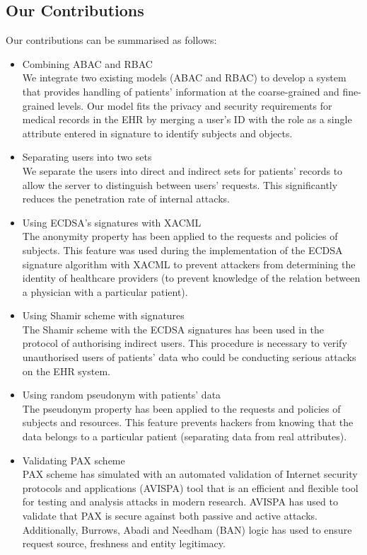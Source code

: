 \documentclass[journal,article,submit,moreauthors,pdftex]{Definitions/mdpi}
\begin{document}
\subsection{Our Contributions}
Our contributions can be summarised as follows:
  \begin{itemize}
\item Combining ABAC and RBAC \\
We integrate two existing models (ABAC and RBAC) to develop a system that provides handling of patients' information at the coarse-grained and fine-grained levels. Our model fits the privacy and security requirements for medical records in the EHR by merging a user's ID with the role as a single attribute entered in signature to identify subjects and objects.
\item Separating users into two sets\\
We separate the users into direct and indirect sets for patients' records to allow the server to distinguish between users' requests. This significantly reduces the penetration rate of internal attacks.
\item Using ECDSA's signatures with XACML\\
The anonymity property has been applied to the requests and policies of subjects. This feature was used during the implementation of the ECDSA signature algorithm with XACML to prevent attackers from determining the identity of healthcare providers (to prevent knowledge of the relation between a physician with a particular patient).
\item Using Shamir scheme with signatures\\
The Shamir scheme with the ECDSA signatures has been used in the protocol of authorising indirect users. This procedure is necessary to verify unauthorised users of patients' data who could be conducting serious attacks on the EHR system.
\item Using random pseudonym with patients' data\\
The pseudonym property has been applied to the requests and policies of subjects and resources. This feature prevents hackers from knowing that the data belongs to a particular patient (separating data from real attributes).
\item Validating PAX scheme\\
PAX scheme has simulated with an automated validation of Internet security protocols and applications (AVISPA) tool that is an efficient and flexible tool for testing and analysis attacks in modern research. AVISPA has used to validate that PAX is secure against both passive and active attacks. Additionally, Burrows, Abadi and Needham (BAN) logic has used to ensure request source, freshness and entity legitimacy.
\end{itemize}
\end{document}

